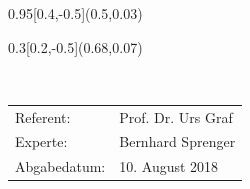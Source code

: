 
\begin{titlepage}
  \setlength{\TPHorizModule}{\paperwidth}
  \setlength{\TPVertModule}{\paperheight}
  
  
  
  \begin{textblock}{0.95}[0.4,-0.5](0.5,0.03)
  \end{textblock}
  \begin{textblock}{0.3}[0.2,-0.5](0.68,0.07)
  \end{textblock}
    \vspace*{8cm}
    \begin{center}
      \Huge{\color{HeadBlue}{Java on the bare ARM metal\\}}
    \vspace*{6cm}
    \normalsize
        {}\\
    \vspace*{1cm}       


    \vspace*{3cm}
    \color{HeadBlue}
    \begin{tabular}{p{3.5cm}l}
      Referent: & Prof. Dr. Urs Graf \\
      Experte: &  Bernhard Sprenger \\
      Abgabedatum: & 10. August 2018
    \end{tabular}\\
    \end{center}
  \end{titlepage}





